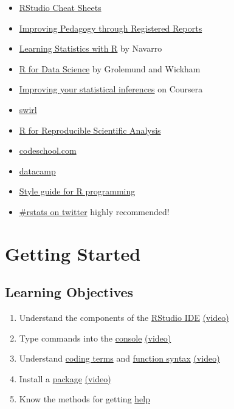 \documentclass[
  oneside]{book}
\providecommand{\tightlist}{%
  \setlength{\itemsep}{0pt}\setlength{\parskip}{0pt}}
\begin{document}
\begin{itemize}
\tightlist
\item
  \href{https://www.rstudio.com/resources/cheatsheets/}{RStudio Cheat Sheets}
\item
  \href{https://psyarxiv.com/q34k8}{Improving Pedagogy through Registered Reports}
\item
  \href{https://learningstatisticswithr-bookdown.netlify.com}{Learning Statistics with R} by Navarro
\item
  \href{http://r4ds.had.co.nz}{R for Data Science} by Grolemund and Wickham
\item
  \href{https://www.coursera.org/learn/statistical-inferences/}{Improving your statistical inferences} on Coursera
\item
  \href{http://swirlstats.com}{swirl}
\item
  \href{http://swcarpentry.github.io/r-novice-gapminder/}{R for Reproducible Scientific Analysis}
\item
  \href{http://tryr.codeschool.com}{codeschool.com}
\item
  \href{https://www.datacamp.com/courses/free-introduction-to-r}{datacamp}
\item
  \href{http://style.tidyverse.org}{Style guide for R programming}
\item
  \href{https://twitter.com/search?q=\%2523rstats}{\#rstats on twitter} highly recommended!
\end{itemize}

\hypertarget{intro}{%
\chapter{Getting Started}\label{intro}}

\hypertarget{ilo-intro}{%
\section{Learning Objectives}\label{ilo-intro}}

\begin{enumerate}
\def\labelenumi{\arabic{enumi}.}
\tightlist
\item
  Understand the components of the \protect\hyperlink{rstudio_ide}{RStudio IDE} \href{https://youtu.be/CbA6ZVlJE78}{(video)}
\item
  Type commands into the \protect\hyperlink{console}{console} \href{https://youtu.be/wbI4c_7y0kE}{(video)}
\item
  Understand \protect\hyperlink{coding-terms}{coding terms} and \protect\hyperlink{function_syx}{function syntax} \href{https://youtu.be/X5P038N5Q8I}{(video)}
\item
  Install a \protect\hyperlink{install-package}{package} \href{https://youtu.be/u_pvHnqkVCE}{(video)}
\item
  Know the methods for getting \protect\hyperlink{help}{help}
\end{enumerate}
\end{document}
